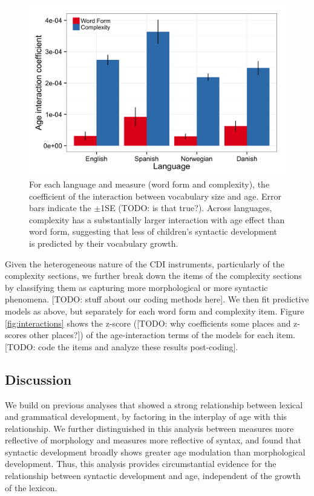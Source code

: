 \documentclass[10pt,letterpaper]{article}
\begin{document}
\begin{figure}[tbh!]
\begin{center}
\includegraphics[width=0.9\linewidth]{plots/coefs_wordform_complexity.png}
\end{center}
\caption{\label{fig:coefs_grammar}  For each language and measure (word form and complexity), the coefficient of the interaction between vocabulary size and age. Error bars indicate the $\pm$1SE (TODO: is that true?). Across languages, complexity has a substantially larger interaction with age effect than word form, suggesting that less of children's syntactic development is predicted by their vocabulary growth.} 
\end{figure}

\clearpage

Given the heterogeneous nature of the CDI instruments, particularly of the complexity sections, we further break down the items of the complexity sections by classifying them as capturing more morphological or more syntactic phenomena. [TODO: stuff about our coding methods here]. We then fit predictive models as above, but separately for each word form and complexity item. Figure \ref{fig:interactions} shows the z-score ([TODO: why coefficients some places and z-scores other places?]) of the age-interaction terms of the models for each item. [TODO: code the items and analyze these results post-coding].

\subsection{Discussion}

We build on previous analyses that showed a strong relationship between lexical and grammatical development, by factoring in the interplay of age with this relationship. We further distinguished in this analysis between measures more reflective of morphology and measures more reflective of syntax, and found that syntactic development broadly shows greater age modulation than morphological development. Thus, this analysis provides circumstantial evidence for the relationship between syntactic development and age, independent of the growth of the lexicon. 
\end{document}
